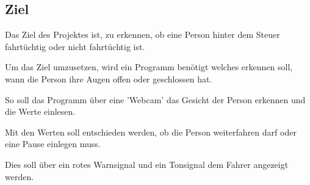 \subsection{Ziel}
Das Ziel des Projektes ist, zu erkennen, ob eine Person hinter dem Steuer fahrtüchtig oder nicht fahrtüchtig ist. 

Um das Ziel umzusetzen, wird ein Programm benötigt welches erkennen soll, wann die Person ihre Augen offen oder geschlossen hat.

So soll das Programm über eine 'Webcam' das Gesicht der Person erkennen und die Werte einlesen.

Mit den Werten soll entschieden werden, ob die Person weiterfahren darf oder eine Pause einlegen muss.

Dies soll über ein rotes Warnsignal und ein Tonsignal dem Fahrer angezeigt werden.
\newline
\newline